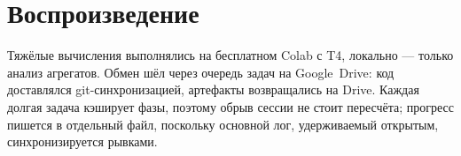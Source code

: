 \documentclass[11pt,a4paper]{article}
\begin{document}
\section{Воспроизведение}

Тяжёлые вычисления выполнялись на бесплатном Colab с T4, локально --- только
анализ агрегатов. Обмен шёл через очередь задач на Google~Drive: код доставлялся
git-синхронизацией, артефакты возвращались на Drive. Каждая долгая задача
кэширует фазы, поэтому обрыв сессии не стоит пересчёта; прогресс пишется в
отдельный файл, поскольку основной лог, удерживаемый открытым, синхронизируется
рывками.
\end{document}
